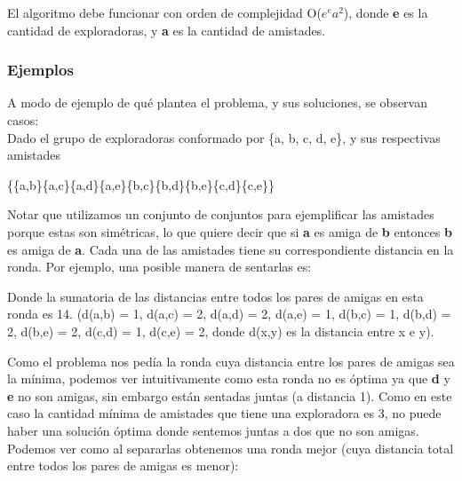 \documentclass[11pt]{article}
\begin{document}
El algoritmo debe funcionar con orden de complejidad O($e^{e}  a^{2}$), donde \textbf{e} es la cantidad de exploradoras, y \textbf{a} es la cantidad de amistades.

\subsubsection{Ejemplos}

A modo de ejemplo de qué plantea el problema, y sus soluciones, se observan casos:\\ 

Dado el grupo de exploradoras conformado por \{a, b, c, d, e\}, y sus respectivas amistades 

\begin{center}
\{\{a,b\}\{a,c\}\{a,d\}\{a,e\}\{b,c\}\{b,d\}\{b,e\}\{c,d\}\{c,e\}\}
\end{center}

Notar que utilizamos un conjunto de conjuntos para ejemplificar las amistades porque estas son simétricas, lo que quiere
decir que si \textbf{a} es amiga de \textbf{b} entonces \textbf{b} es amiga de \textbf{a}. Cada una de las
amistades tiene su correspondiente distancia en la ronda. Por ejemplo, una posible manera de sentarlas es:

\begin{figure}[H]
\begin{center}
\end{center}
\end{figure}

Donde la sumatoria de las distancias entre todos los pares de amigas en esta ronda es 14. (d(a,b) = 1, d(a,c) = 2, d(a,d) = 2, d(a,e) = 1, d(b,c) = 1, d(b,d) = 2, d(b,e) = 2, d(c,d) = 1, d(c,e) = 2, donde d(x,y) es la distancia entre x e y).

Como el problema nos pedía la ronda cuya distancia entre los pares de amigas sea la mínima, podemos 
ver intuitivamente como esta ronda no es óptima ya que \textbf{d} y \textbf{e} no son amigas, sin embargo
están sentadas juntas (a distancia 1). Como en este caso la cantidad mínima de amistades que tiene
una exploradora es 3, no puede haber una solución óptima donde sentemos juntas a dos que no son amigas.
Podemos ver como al separarlas obtenemos una ronda mejor (cuya distancia total entre todos los
pares de amigas es menor):
\end{document}
